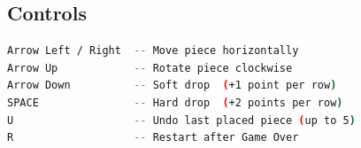 \documentclass[11pt]{article}
\begin{document}
\subsection{Controls}
\begin{lstlisting}[language=bash, caption={In-game keyboard controls}]
Arrow Left / Right  -- Move piece horizontally
Arrow Up            -- Rotate piece clockwise
Arrow Down          -- Soft drop  (+1 point per row)
SPACE               -- Hard drop  (+2 points per row)
U                   -- Undo last placed piece (up to 5)
R                   -- Restart after Game Over
\end{lstlisting}
\end{document}

